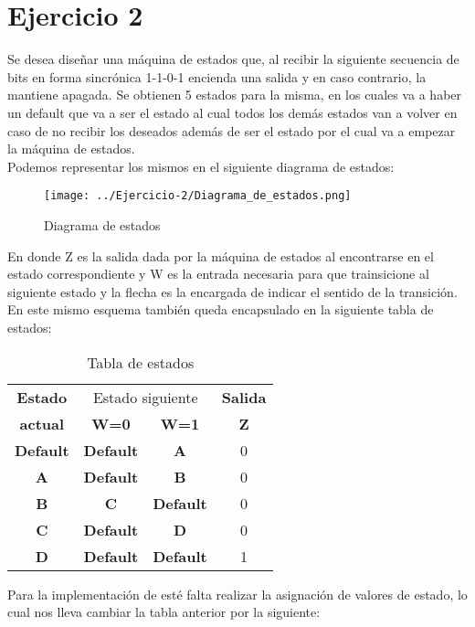 \chapter{Ejercicio 2}
Se desea diseñar una máquina de estados que, al recibir la siguiente secuencia de bits en forma sincrónica 1-1-0-1 encienda una salida y en caso contrario, la mantiene apagada. Se obtienen 5 estados para la misma, en los cuales va a haber un default que va a ser el estado al cual todos los demás estados van a volver en caso de no recibir los deseados además de ser el estado por el cual va a empezar la máquina de estados.\\
Podemos representar los mismos en el siguiente diagrama de estados:\\
\begin{figure}[h!]
	\label{f:Moore}
	\centering
	\texttt{[image: ../Ejercicio-2/Diagrama\_de\_estados.png]}
	\caption{Diagrama de estados}
\end{figure}
En donde Z es la salida dada por la máquina de estados al encontrarse en el estado correspondiente y W es la entrada necesaria para que trainsicione al siguiente estado y la flecha es la encargada de indicar el sentido de la transición.\\
En este mismo esquema también queda encapsulado en la siguiente tabla de estados:\\
\FloatBarrier
\begin{table}[h!]
	\begin{center}
		\caption{Tabla de estados}
			\begin{tabular}{|c|c c|c|}
			\hline
			\textbf{Estado} &\multicolumn{2}{|c|}{Estado siguiente} & \textbf{Salida}\\
			\textbf{actual} & \textbf{ W=0 } & \textbf{ W=1 } & \textbf{Z}\\
			\hline
			\textbf{Default} & \textbf{ Default } & \textbf{ A } & 0\\
			\hline
			\textbf{A} & \textbf{ Default } & \textbf{ B } & 0\\
			\hline
			\textbf{B} & \textbf{ C } & \textbf{Default } & 0\\
			\hline
			\textbf{C} & \textbf{ Default } & \textbf{ D } & 0\\
			\hline
			\textbf{D} & \textbf{Default } & \textbf{Default} & 1\\
			\hline
			\end{tabular}
	\end{center}
\end{table}
\FloatBarrier
Para la implementación de esté falta realizar la asignación de valores de estado, lo cual nos lleva cambiar la tabla anterior por la siguiente:\\
